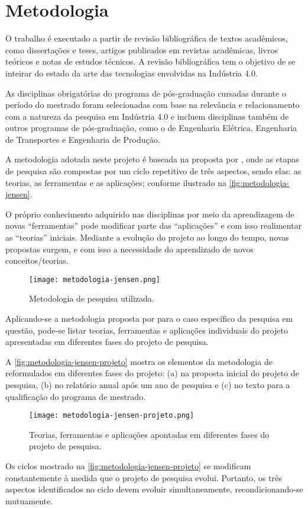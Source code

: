 \chapter{Metodologia}
\label{cha:metodologia}

	O trabalho é executado a partir de revisão bibliográfica de textos acadêmicos, como dissertações e teses, artigos publicados em revistas acadêmicas, livros teóricos e notas de estudos técnicos. A revisão bibliográfica tem o objetivo de se inteirar do estado da arte das tecnologias envolvidas na Indústria 4.0.
	
	As disciplinas obrigatórias do programa de pós-graduação cursadas durante o período do mestrado foram selecionadas com base na relevância e relacionamento com a natureza da pesquisa em Indústria 4.0 e incluem disciplinas também de outros programas de pós-graduação, como o de Engenharia Elétrica, Engenharia de Transportes e Engenharia de Produção.
	
	A metodologia adotada neste projeto é baseada na proposta por , onde as etapas de pesquisa são compostas por um ciclo repetitivo de três aspectos, sendo elas: as teorias, as ferramentas e as aplicações; conforme ilustrado na \autoref{fig:metodologia-jensen}.
	
	O próprio conhecimento adquirido nas disciplinas por meio da aprendizagem de novas ``ferramentas'' pode modificar parte das ``aplicações'' e com isso realimentar as ``teorias'' iniciais. Mediante a evolução do projeto ao longo do tempo, novas propostas surgem, e com isso a necessidade do aprendizado de novos conceitos/teorias.

	\begin{figure}[htb]
		\centering
		\caption{Metodologia de pesquisa utilizada.}
		\label{fig:metodologia-jensen}
		\texttt{[image: metodologia-jensen.png]}
	\end{figure}

	Aplicando-se a metodologia proposta por  para o caso específico da pesquisa em questão, pode-se listar teorias, ferramentas e aplicações individuais do projeto apresentadas em diferentes fases do projeto de pesquisa.
	
	A \autoref{fig:metodologia-jensen-projeto} mostra os elementos da metodologia de  reformulados em diferentes fases do projeto: (a) na proposta inicial do projeto de pesquisa, (b) no relatório anual após um ano de pesquisa e (c) no texto para a qualificação do programa de mestrado.
	
	\begin{figure}[htb]
		\centering
		\caption{Teorias, ferramentas e aplicações apontadas em diferentes fases do projeto de pesquisa.}
		\label{fig:metodologia-jensen-projeto}
		\texttt{[image: metodologia-jensen-projeto.png]}
	\end{figure}
	
	 Os ciclos mostrado na \autoref{fig:metodologia-jensen-projeto} se modificam constantemente à medida que o projeto de pesquisa evolui. Portanto, os três aspectos identificados no ciclo devem evoluir simultaneamente, recondicionando-se mutuamente.
